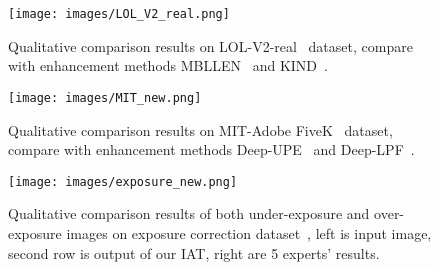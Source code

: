 \documentclass{bmvc2k}
\begin{document}
\begin{figure}[t]
    \centering
    \texttt{[image: images/LOL\_V2\_real.png]}
\caption{Qualitative comparison results on  LOL-V2-real~\cite{LOL_dataset} dataset, compare with enhancement methods MBLLEN~\cite{Lv2018MBLLEN} and KIND~\cite{KIND}.}
    \label{fig:LOL_V2}
\end{figure}

\begin{figure}[t]
    \centering
    \texttt{[image: images/MIT\_new.png]}
\caption{Qualitative comparison results on MIT-Adobe FiveK~\cite{fivek_dataset} dataset, compare with enhancement methods Deep-UPE~\cite{DeepUPE_2019_CVPR} and Deep-LPF~\cite{Deep_LPF}.}
    \label{fig:MIT5k}
\end{figure}

\begin{figure}[t]
    \centering
    \texttt{[image: images/exposure\_new.png]}
\caption{Qualitative comparison results of both under-exposure and over-exposure images on exposure correction dataset~\cite{Exposure_2021_CVPR}, left is input image, second row is output of our IAT, right are 5 experts' results.}
    \label{fig:exposure}
\end{figure}
\end{document}
